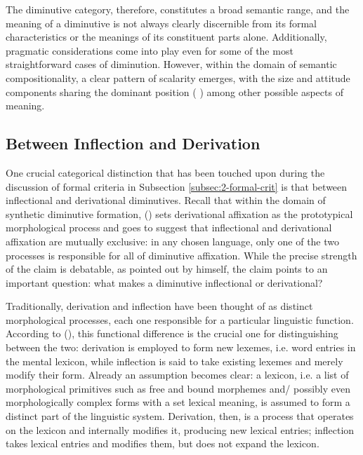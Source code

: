 The diminutive category, therefore, constitutes a broad semantic range, and the meaning of a diminutive is not always clearly discernible from its formal characteristics or the meanings of its constituent parts alone. Additionally, pragmatic considerations come into play even for some of the most straightforward cases of diminution. However, within the domain of semantic compositionality, a clear pattern of scalarity emerges, with the size and attitude components sharing the dominant position (\citeauthor{Schneider+2003} \citeyear{Schneider+2003}) among other possible aspects of meaning.

\subsection{Between Inflection and Derivation}
\label{subsec:2-infl-deriv}
One crucial categorical distinction that has been touched upon during the discussion of formal criteria in Subsection \ref{subsec:2-formal-crit} is that between inflectional and derivational diminutives. Recall that within the domain of synthetic diminutive formation, \citeauthor{Schneider+2003} (\citeyear{Schneider+2003}) sets derivational affixation as the prototypical morphological process and goes to suggest that inflectional and derivational affixation are mutually exclusive: in any chosen language, only one of the two processes is responsible for all of diminutive affixation. While the precise strength of the claim is debatable, as pointed out by \citeauthor{Schneider+2003} himself, the claim points to an important question: what makes a diminutive inflectional or derivational?

Traditionally, derivation and inflection have been thought of as distinct morphological processes, each one responsible for a particular linguistic function. According to \citeauthor{Booij+2000} (\citeyear{Booij+2000}), this functional difference is the crucial one for distinguishing between the two: derivation is employed to form new lexemes, i.e. word entries in the mental lexicon, while inflection is said to take existing lexemes and merely modify their form. Already an assumption becomes clear: a lexicon, i.e. a list of morphological primitives such as free and bound morphemes and/ possibly even morphologically complex forms with a set lexical meaning, is assumed to form a distinct part of the linguistic system. Derivation, then, is a process that operates on the lexicon and internally modifies it, producing new lexical entries; inflection takes lexical entries and modifies them, but does not expand the lexicon.

